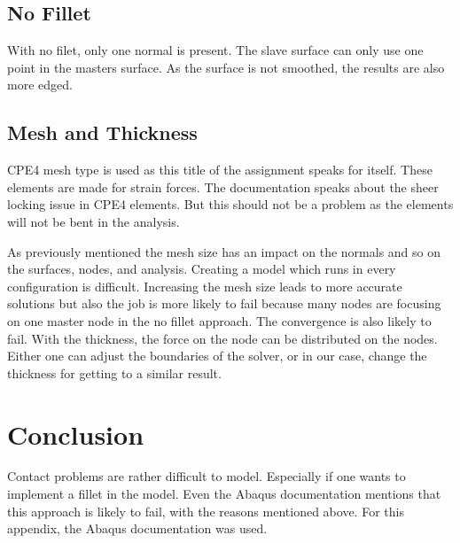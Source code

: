 \documentclass[12pt]{article}
\begin{document}
\subsection{No Fillet}
With no filet, only one normal is present. The slave surface can only use one point in the masters surface. As the surface is not smoothed, the results are also more edged.
\subsection{Mesh and Thickness}
CPE4 mesh type is used as this title of the assignment speaks for itself. These elements are made for strain forces. The documentation speaks about the sheer locking issue in CPE4 elements. But this should not be a problem as the elements will not be bent in the analysis.

As previously mentioned the mesh size has an impact on the normals and so on the surfaces, nodes, and analysis. Creating a model which runs in every configuration is difficult. Increasing the mesh size leads to more accurate solutions but also the job is more likely to fail because many nodes are focusing on one master node in the no fillet approach. The convergence is also likely to fail. With the thickness, the force on the node can be distributed on the nodes. Either one can adjust the boundaries of the solver, or in our case, change the thickness for getting to a similar result.
\section{Conclusion}
Contact problems are rather difficult to model. Especially if one wants to implement a fillet in the model. Even the Abaqus documentation mentions that this approach is likely to fail, with the reasons mentioned above. For this appendix, the Abaqus documentation was used.
\end{document}
